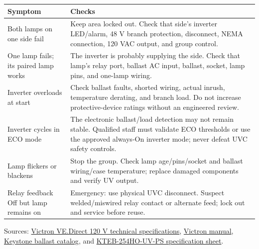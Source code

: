 \documentclass[
  10pt,
  letterpaper,
  openany]{report}
\newcounter{none} %
\begin{document}
{\def\LTcaptype{none} %
\begin{longtable}[]{@{}
  >{\raggedright\arraybackslash}p{}
  >{\raggedright\arraybackslash}p{}@{}}
\toprule\noalign{}
\begin{minipage}[b]{\linewidth}\raggedright
Symptom
\end{minipage} & \begin{minipage}[b]{\linewidth}\raggedright
Checks
\end{minipage} \\
\midrule\noalign{}
\endhead
\bottomrule\noalign{}
\endlastfoot
Both lamps on one side fail & Keep area locked out. Check that side's
inverter LED/alarm, 48 V branch protection, disconnect, NEMA connection,
120 VAC output, and group control. \\
One lamp fails; its paired lamp works & The inverter is probably
supplying the side. Check that lamp's relay port, ballast AC input,
ballast, socket, lamp pins, and one-lamp wiring. \\
Inverter overloads at start & Check ballast faults, shorted wiring,
actual inrush, temperature derating, and branch load. Do not increase
protective-device ratings without an engineered review. \\
Inverter cycles in ECO mode & The electronic ballast/load detection may
not remain stable. Qualified staff must validate ECO thresholds or use
the approved always-On inverter mode; never defeat UVC safety
controls. \\
Lamp flickers or blackens & Stop the group. Check lamp age/pins/socket
and ballast wiring/case temperature; replace damaged components and
verify UV output. \\
Relay feedback Off but lamp remains on & Emergency: use physical UVC
disconnect. Suspect welded/miswired relay contact or alternate feed;
lock out and service before reuse. \\
\end{longtable}
}

Sources:
\href{https://www.victronenergy.com/media/pg/Inverter_VE.Direct_120V_-_HW15/en/technical-specifications.html}{Victron
VE.Direct 120 V technical specifications},
\href{https://www.victronenergy.com/upload/documents/Inverter_VE.Direct_120V_-_HW15/106668-Inverter_VE_Direct__Smart_and_SUN-pdf-en.pdf}{Victron
manual},
\href{https://www.keystonetech.com/products/power-supplies/ballasts/electronic-fluorescent?page=3}{Keystone
ballast catalog}, and
\href{https://ballastshop.com/content/media/images/SpecSheets/KTEB-254HO-UV-PS.pdf}{KTEB-254HO-UV-PS
specification sheet}.
\end{document}
